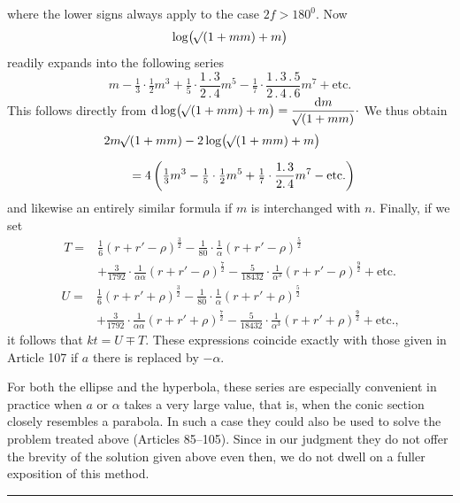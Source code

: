 \noindent where the lower signs always apply to the case $2f>180^0$. Now
\[
\log\bigl(\mathord{{}^{}\!\surd}(1+mm)+m\bigr)
\]
\noindent readily expands into the following series
\[
m-\tfrac13\cdot\tfrac12m^3+\tfrac15\cdot\frac{1\mathpunct{.}3}{2\mathpunct{.}4}m^5-\tfrac17\cdot\frac{1\mathpunct{.}3\mathpunct{.}5}{2\mathpunct{.}4\mathpunct{.}6}m^7+\text{etc.}
\]
\noindent This follows directly from $\mathrm d\log\bigl(\mathord{{}^{}\!\surd}(1+mm)+m\bigr)=\dfrac{\mathrm dm}{\mathord{{}^{}\!\surd}(1+mm)}\mathpunct{\cdot}$ We thus obtain
\[
\begin{aligned}
&2m\mathord{{}^{}\!\surd}(1+mm)-2\log\bigl(\mathord{{}^{}\!\surd}(1+mm)+m\bigr)\\[.6em]
&\qquad=4\left(\tfrac13m^3-\tfrac15\cdot\tfrac12m^5+\tfrac17\cdot\frac{1\mathpunct{.}3}{2\mathpunct{.}4}m^7-\text{etc.}\right)
\end{aligned}
\]
\noindent{}and likewise an entirely similar formula if $m$ is interchanged with $n$. Finally, if we set
\[
\begin{aligned}
T={}&\tfrac16(r+r'-\rho)^{\frac32}-\tfrac1{80}\cdot\frac1\alpha(r+r'-\rho)^{\frac52}\\[.6em]
&+\tfrac3{1792}\cdot\frac1{\alpha\alpha}(r+r'-\rho)^{\frac72}-\tfrac5{18432}\cdot\frac1{\alpha^3}(r+r'-\rho)^{\frac92}+\text{etc.}
\end{aligned}
\]
\[
\begin{aligned}
U={}&\tfrac16(r+r'+\rho)^{\frac32}-\tfrac1{80}\cdot\frac1\alpha(r+r'+\rho)^{\frac52}\\[.6em]
&+\tfrac3{1792}\cdot\frac1{\alpha\alpha}(r+r'+\rho)^{\frac72}-\tfrac5{18432}\cdot\frac1{\alpha^3}(r+r'+\rho)^{\frac92}+\text{etc.,}
\end{aligned}
\]
\noindent it follows that $kt=U\mp T$. These expressions coincide exactly with those given in Article 107 if $a$ there is replaced by $-\alpha$.
\par
For both the ellipse and the hyperbola, these series are especially convenient in practice when $a$ or $\alpha$ takes a very large value, that is, when the conic section closely resembles a parabola. In such a case they could also be used to solve the problem treated above (Articles 85--105). Since in our judgment they do not offer the brevity of the solution given above even then, we do not dwell on a fuller exposition of this method.
\par\bigskip\begin{center}\rule{.23\linewidth}{.35pt}\end{center}
